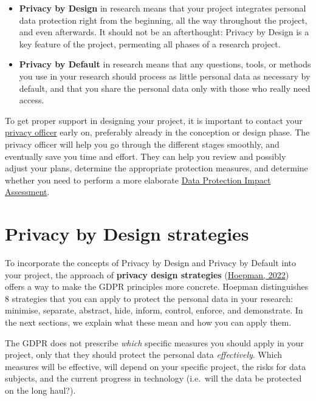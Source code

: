 \documentclass[
]{book}
\providecommand{\tightlist}{%
  \setlength{\itemsep}{0pt}\setlength{\parskip}{0pt}}
\begin{document}
\begin{itemize}
\tightlist
\item
  \textbf{Privacy by Design} in research means that your project integrates personal
  data protection right from the beginning, all the way throughout the project,
  and even afterwards. It should not be an afterthought: Privacy by Design is a
  key feature of the project, permeating all phases of a research project.
\item
  \textbf{Privacy by Default} in research means that any questions, tools, or methods
  you use in your research should process as little personal data as necessary by
  default, and that you share the personal data only with those who really need
  access.
\end{itemize}

To get proper support in designing your project, it is important to contact your
\protect\hyperlink{support}{privacy officer} early on, preferably already in the conception or design phase. The privacy
officer will help you go through the different stages smoothly, and eventually
save you time and effort. They can help you review and possibly adjust your
plans, determine the appropriate protection measures, and determine whether you
need to perform a more elaborate \protect\hyperlink{dpia}{Data Protection Impact Assessment}.

\hypertarget{design-strategies}{%
\section{Privacy by Design strategies}\label{design-strategies}}

To incorporate the concepts of Privacy by Design and Privacy by Default into
your project, the approach of \textbf{privacy design strategies}
(\href{https://www.cs.ru.nl/~jhh/publications/pds-booklet.pdf}{Hoepman, 2022})
offers a way to make the GDPR principles more concrete. Hoepman distinguishes 8
strategies that you can apply to protect the personal data in your research:
minimise, separate, abstract, hide, inform, control, enforce, and demonstrate.
In the next sections, we explain what these mean and how you can apply them.

The GDPR does not prescribe \emph{which} specific measures you should apply in your
project, only that they should protect the personal data \emph{effectively}. Which
measures will be effective, will depend on your specific project, the risks for
data subjects, and the current progress in technology (i.e.~will the data be
protected on the long haul?).
\end{document}
